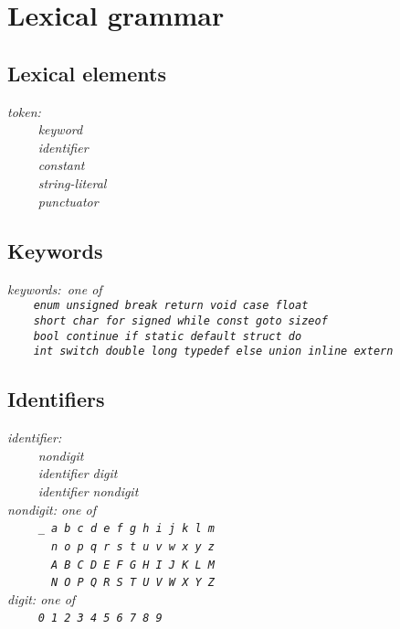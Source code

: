 \documentclass[12pt]{report}
\def\|{\verb|}
\begin{document}
\chapter{Lexical grammar}
\rm
\section{Lexical elements}
\it
\noindent
token:\\
\|    | keyword\\
\|    | identifier\\
\|    | constant\\
\|    | string-literal\\
\|    | punctuator\\

\rm
\section{Keywords}
\it
\noindent
keywords: {\rm one of}\\
\|    | \verb+enum unsigned break return void case float+ \\
\|    | \verb+short char for signed while const goto sizeof+ \\
\|    | \verb+bool continue if static default struct do+ \\
\|    | \verb+int switch double long typedef else union inline extern+ \\

\rm
\section{Identifiers}
\it
\noindent
identifier:\\
\|    | nondigit\\
\|    | identifier digit\\
\|    | identifier nondigit\\

\noindent
nondigit: {\rm one of}\\
\|    | \verb+_ a b c d e f g h i j k l m+\\
\|    | \verb+  n o p q r s t u v w x y z+\\
\|    | \verb+  A B C D E F G H I J K L M+\\
\|    | \verb+  N O P Q R S T U V W X Y Z+\\

\noindent
digit: {\rm one of}\\
\|    | \verb+0 1 2 3 4 5 6 7 8 9+\\
\end{document}
